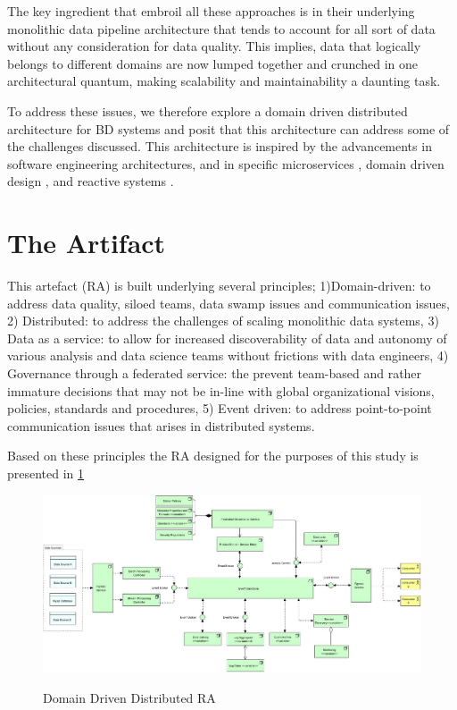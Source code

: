 \documentclass[runningheads]{llncs}
\begin{document}
The key ingredient that embroil all these approaches is in their underlying monolithic data pipeline architecture that tends to account for all sort of data without any consideration for data quality. This implies, data that logically belongs to different domains are now lumped together and crunched in one architectural quantum, making scalability and maintainability a daunting task. 


To address these issues, we therefore explore a domain driven distributed architecture for BD systems and posit that this architecture can address some of the challenges discussed. This architecture is inspired by the advancements in software engineering architectures, and in specific microservices \cite{bellemare2020building}, domain driven design \cite{evans2004domain}, and reactive systems \cite{aceto2007reactive}. 

\section*{The Artifact}

This artefact (RA) is built underlying several principles; 1)Domain-driven: to address data quality, siloed teams, data swamp issues and communication issues, 2) Distributed: to address the challenges of scaling monolithic data systems, 3) Data as a service: to allow for increased discoverability of data and autonomy of various analysis and data science teams without frictions with data engineers, 4) Governance through a federated service: the prevent team-based and rather immature decisions that may not be in-line with global organizational visions, policies, standards and procedures, 5) Event driven: to address point-to-point communication issues that arises in distributed systems.

Based on these principles the RA designed for the purposes of this study is presented in \ref{RA}

\begin{figure}[h!]
    \centering
    \includegraphics[width=12cm]{Media/Metamycelium.jpg}
    \label{RA}
    \caption{Domain Driven Distributed RA}
\end{figure}
\end{document}
